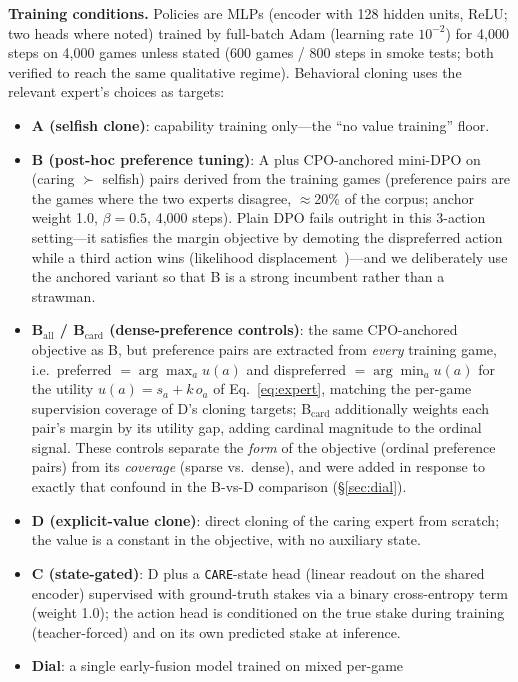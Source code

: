 \documentclass[11pt]{article}
\newcommand{\care}{\texttt{CARE}}
\begin{document}
\textbf{Training conditions.} Policies are MLPs (encoder with 128 hidden units, ReLU; two heads
where noted) trained by full-batch Adam (learning rate $10^{-2}$) for 4{,}000 steps on 4{,}000
games unless stated (600 games / 800 steps in smoke tests; both verified to reach the same
qualitative regime). Behavioral cloning uses the relevant expert's choices as targets:
\begin{itemize}
\item \textbf{A (selfish clone)}: capability training only---the ``no value training'' floor.
\item \textbf{B (post-hoc preference tuning)}: A plus CPO-anchored mini-DPO on
  (caring $\succ$ selfish) pairs derived from the training games (preference pairs are the games
  where the two experts disagree, $\approx$20\% of the corpus; anchor weight 1.0,
  $\beta{=}0.5$, 4{,}000 steps). Plain DPO fails outright in this 3-action setting---it
  satisfies the margin objective by demoting the dispreferred action while a third action wins
  (likelihood displacement~\cite{razin2024unintentional})---and we deliberately use the anchored
  variant so that B is a strong incumbent rather than a strawman.
\item \textbf{B$_{\mathrm{all}}$ / B$_{\mathrm{card}}$ (dense-preference controls)}: the same
  CPO-anchored objective as B, but preference pairs are extracted from \emph{every} training
  game, i.e.\ preferred $= \arg\max_a u(a)$ and dispreferred $= \arg\min_a u(a)$ for the
  utility $u(a) = s_a + k\,o_a$ of Eq.~\eqref{eq:expert}, matching the per-game supervision coverage of D's cloning targets;
  B$_{\mathrm{card}}$ additionally weights each pair's margin by its utility gap, adding cardinal
  magnitude to the ordinal signal. These controls separate the \emph{form} of the objective
  (ordinal preference pairs) from its \emph{coverage} (sparse vs.\ dense), and were added in
  response to exactly that confound in the B-vs-D comparison (\S\ref{sec:dial}).
\item \textbf{D (explicit-value clone)}: direct cloning of the caring expert from scratch; the
  value is a constant in the objective, with no auxiliary state.
\item \textbf{C (state-gated)}: D plus a \care{}-state head (linear readout on the shared
  encoder) supervised with ground-truth stakes via a binary cross-entropy term (weight 1.0);
  the action head is conditioned on the true stake during training (teacher-forced) and on its
  own predicted stake at inference.
\item \textbf{Dial}: a single early-fusion model trained on mixed per-game

\end{itemize}
\end{document}
